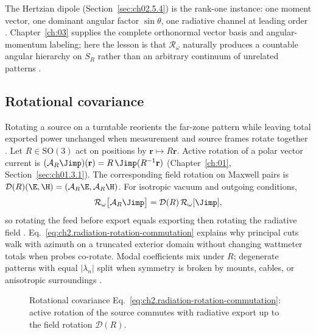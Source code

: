 The Hertzian dipole (Section~\ref{sec:ch02.5.4}) is the rank-one instance: one moment vector, one dominant angular factor $\sin\theta$, one radiative channel at leading order \cite{jackson1999}. Chapter~\ref{ch:03} supplies the complete orthonormal vector basis and angular-momentum labeling; here the lesson is that $\mathcal{R}_\omega$ naturally produces a countable angular hierarchy on $S_R$ rather than an arbitrary continuum of unrelated patterns \cite{stratton1941}.

\subsection{Rotational covariance}
\label{sec:ch02.7b.3}

Rotating a source on a turntable reorients the far-zone pattern while leaving total exported power unchanged when measurement and source frames rotate together \cite{harrington2001}. Let $R\in\mathrm{SO}(3)$ act on positions by $\mathbf{r}\mapsto R\mathbf{r}$. Active rotation of a polar vector current is $(\mathcal{A}_R\Jimp)(\mathbf{r})=R\,\Jimp(R^{-1}\mathbf{r})$ (Chapter~\ref{ch:01}, Section~\ref{sec:ch01.3.1}). The corresponding field rotation on Maxwell pairs is $\mathcal{D}(R)(\E,\H)=(\mathcal{A}_R\E,\mathcal{A}_R\H)$. For isotropic vacuum and outgoing conditions,
\begin{equation}
\label{eq:ch2.radiation-rotation-commutation}
\mathcal{R}_\omega\big[\mathcal{A}_R\Jimp\big]
=
\mathcal{D}(R)\,\mathcal{R}_\omega[\Jimp],
\end{equation}
so rotating the feed before export equals exporting then rotating the radiative field \cite{stratton1941,harrington2001}. Eq.~\eqref{eq:ch2.radiation-rotation-commutation} explains why principal cuts walk with azimuth on a truncated exterior domain without changing wattmeter totals when probes co-rotate. Modal coefficients mix under $R$; degenerate patterns with equal $|\lambda_n|$ split when symmetry is broken by mounts, cables, or anisotropic surroundings \cite{stratton1941}.

\begin{figure}[t]
\centering
{}
\caption{Rotational covariance Eq.~\eqref{eq:ch2.radiation-rotation-commutation}: active rotation of the source commutes with radiative export up to the field rotation $\mathcal{D}(R)$.}
\label{fig:ch2.rotation-radiation-covariance}
\end{figure}

